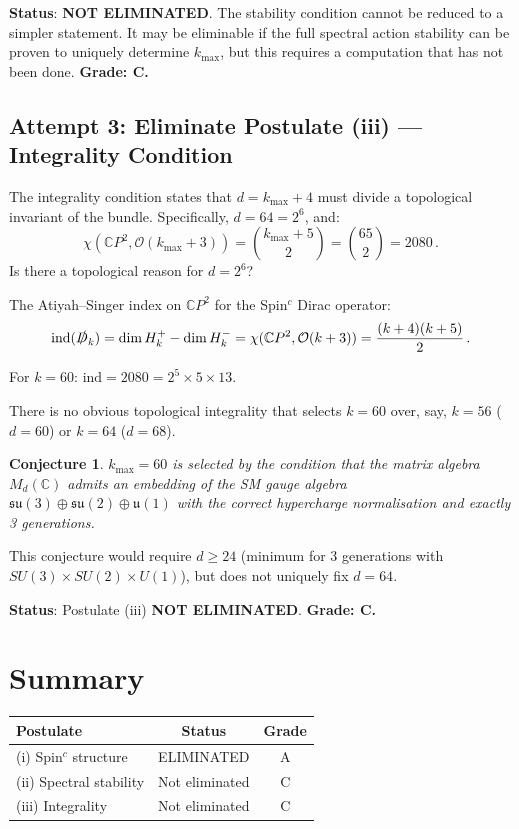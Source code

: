 \documentclass[11pt,a4paper]{article}
\newtheorem{conjecture}{Conjecture}
\newcommand{\CP}{\mathbb{C}P}
\begin{document}
\textbf{Status}: \textbf{NOT ELIMINATED}. The stability condition cannot be reduced to a simpler statement. It may be eliminable if the full spectral action stability can be proven to uniquely determine $k_{\max}$, but this requires a computation that has not been done. \textbf{Grade: C.}

\subsection{Attempt 3: Eliminate Postulate (iii) --- Integrality Condition}

The integrality condition states that $d = k_{\max} + 4$ must divide a topological invariant of the bundle. Specifically, $d = 64 = 2^6$, and:
\begin{equation}
\chi(\CP^2, \mathcal{O}(k_{\max}+3)) = \binom{k_{\max}+5}{2} = \binom{65}{2} = 2080\,.
\end{equation}
Is there a topological reason for $d = 2^6$?

The Atiyah--Singer index on $\CP^2$ for the Spin$^c$ Dirac operator:
\begin{equation}
\mathrm{ind}(\slashed{D}_{k}) = \dim H_k^+ - \dim H_k^- = \chi(\CP^2, \mathcal{O}(k+3)) = \frac{(k+4)(k+5)}{2}\,.
\end{equation}

For $k = 60$: $\mathrm{ind} = 2080 = 2^5 \times 5 \times 13$.

There is no obvious topological integrality that selects $k = 60$ over, say, $k = 56$ ($d = 60$) or $k = 64$ ($d = 68$).

\begin{conjecture}
$k_{\max} = 60$ is selected by the condition that the matrix algebra $M_d(\mathbb{C})$ admits an embedding of the SM gauge algebra $\mathfrak{su}(3) \oplus \mathfrak{su}(2) \oplus \mathfrak{u}(1)$ with the correct hypercharge normalisation and exactly 3 generations.
\end{conjecture}

This conjecture would require $d \geq 24$ (minimum for 3 generations with $SU(3) \times SU(2) \times U(1)$), but does not uniquely fix $d = 64$.

\textbf{Status}: Postulate (iii) \textbf{NOT ELIMINATED}. \textbf{Grade: C.}

\section{Summary}

\begin{center}
\begin{tabular}{lcc}
\toprule
\textbf{Postulate} & \textbf{Status} & \textbf{Grade} \\
\midrule
(i) Spin$^c$ structure & ELIMINATED & A \\
(ii) Spectral stability & Not eliminated & C \\
(iii) Integrality & Not eliminated & C \\
\bottomrule
\end{tabular}
\end{center}
\end{document}
